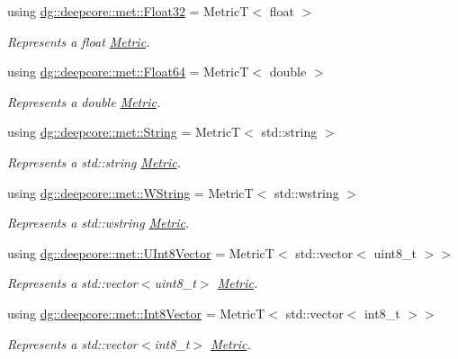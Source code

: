 \begin{DoxyCompactItemize}
using \hyperlink{group___process_metrics_gaee2fce12beb02ae0debbf3cefa36233c}{dg\+::deepcore\+::met\+::\+Float32} = MetricT$<$ float $>$
\begin{DoxyCompactList}\small\item\em Represents a {\ttfamily float} \hyperlink{classdg_1_1deepcore_1_1_metric}{Metric}. \end{DoxyCompactList}\item 
using \hyperlink{group___process_metrics_gaaab936172e4530d446a0701884c45462}{dg\+::deepcore\+::met\+::\+Float64} = MetricT$<$ double $>$
\begin{DoxyCompactList}\small\item\em Represents a {\ttfamily double} \hyperlink{classdg_1_1deepcore_1_1_metric}{Metric}. \end{DoxyCompactList}\item 
using \hyperlink{group___process_metrics_ga0b257f8c37ca91b205247869b5551dfc}{dg\+::deepcore\+::met\+::\+String} = MetricT$<$ std\+::string $>$
\begin{DoxyCompactList}\small\item\em Represents a {\ttfamily std\+::string} \hyperlink{classdg_1_1deepcore_1_1_metric}{Metric}. \end{DoxyCompactList}\item 
using \hyperlink{group___process_metrics_gab5555b62cbb470dbeed23c40147b9e06}{dg\+::deepcore\+::met\+::\+W\+String} = MetricT$<$ std\+::wstring $>$
\begin{DoxyCompactList}\small\item\em Represents a {\ttfamily std\+::wstring} \hyperlink{classdg_1_1deepcore_1_1_metric}{Metric}. \end{DoxyCompactList}\item 
using \hyperlink{group___process_metrics_gadf575847656bb4166faff7d30306d1f9}{dg\+::deepcore\+::met\+::\+U\+Int8\+Vector} = MetricT$<$ std\+::vector$<$ uint8\+\_\+t $>$$>$
\begin{DoxyCompactList}\small\item\em Represents a {\ttfamily std\+::vector$<$uint8\+\_\+t$>$} \hyperlink{classdg_1_1deepcore_1_1_metric}{Metric}. \end{DoxyCompactList}\item 
using \hyperlink{group___process_metrics_gacb7db62769772226cbad4d2d10b790f5}{dg\+::deepcore\+::met\+::\+Int8\+Vector} = MetricT$<$ std\+::vector$<$ int8\+\_\+t $>$$>$
\begin{DoxyCompactList}\small\item\em Represents a {\ttfamily std\+::vector$<$int8\+\_\+t$>$} \hyperlink{classdg_1_1deepcore_1_1_metric}{Metric}. \end{DoxyCompactList}\item 

\end{DoxyCompactItemize}
